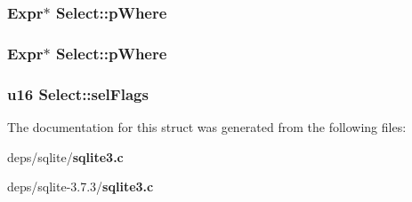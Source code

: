 \subsubsection{\setlength{\rightskip}{0pt plus 5cm}\bf{Expr}$\ast$ \bf{Select::p\-Where}}\label{structSelect_6173dde42b5fcd91ad57c6ba8d3d463a}


\subsubsection{\setlength{\rightskip}{0pt plus 5cm}\bf{Expr}$\ast$ \bf{Select::p\-Where}}\label{structSelect_6173dde42b5fcd91ad57c6ba8d3d463a}


\subsubsection{\setlength{\rightskip}{0pt plus 5cm}\bf{u16} \bf{Select::sel\-Flags}}\label{structSelect_e15d8ae7f27c825c49857a4db306f6d6}




The documentation for this struct was generated from the following files:\begin{CompactItemize}
\item 
deps/sqlite/\bf{sqlite3.c}\item 
deps/sqlite-3.7.3/\bf{sqlite3.c}\end{CompactItemize}
